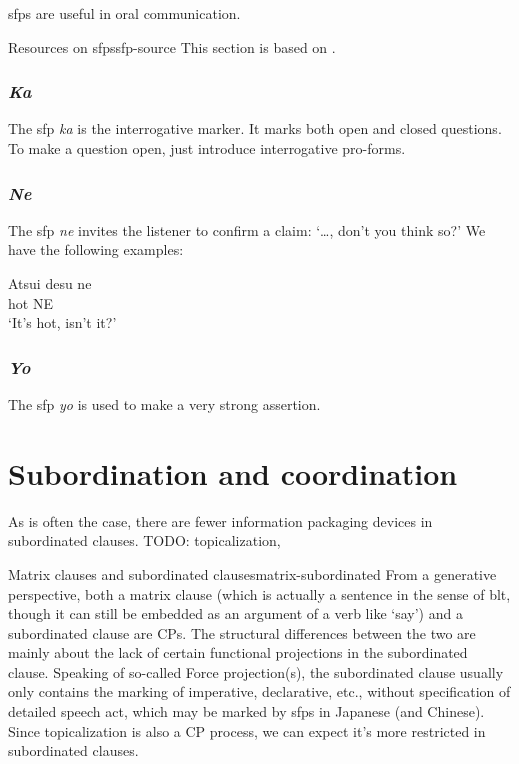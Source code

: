 \documentclass[UTF8, a4paper, oneside, scheme=plain]{ctexrep}
\newcommand*{\citesec}[1]{\S~{#1}}
\newcommand{\corpus}[1]{\emph{#1}}
\newcommand{\translate}[1]{`#1'}
\begin{document}
\ac{sfp}s are useful in oral communication.

\begin{infobox}{Resources on \ac{sfp}s}{sfp-source}
    This section is based on \citet[\citesec{6.4}]{akiyama2012japanese}.
\end{infobox}

\subsection{\corpus{Ka}}

The \ac{sfp} \corpus{ka} is the interrogative marker.
It marks both open and closed questions.
To make a question open,
just introduce interrogative pro-forms.

\subsection{\corpus{Ne}}

The \ac{sfp} \corpus{ne} invites the listener to confirm a claim:
\translate{\dots, don't you think so?}
We have the following examples:
\begin{exe}
    \ex \gll Atsui desu ne  \\
    hot {} NE  \\
    \glt \translate{It's hot, isn't it?}
\end{exe}

\subsection{\corpus{Yo}}

The \ac{sfp} \corpus{yo} is used to make a very strong assertion.

\chapter{Subordination and coordination}

As is often the case, there are fewer information packaging devices in subordinated clauses.
TODO: topicalization, 

\begin{theorybox}{Matrix clauses and subordinated clauses}{matrix-subordinated}
    From a generative perspective, both a matrix clause 
    (which is actually a sentence in the sense of \acs{blt}, 
    though it can still be embedded as an argument of a verb like \translate{say})
    and a subordinated clause are CPs.
    The structural differences between the two 
    are mainly about the lack of certain functional projections in the subordinated clause.
    Speaking of so-called Force projection(s),
    the subordinated clause usually only contains the marking of 
    imperative, declarative, etc.,
    without specification of detailed speech act,
    which may be marked by \ac{sfp}s in Japanese (and Chinese).
    Since topicalization is also a CP process,
    we can expect it's more restricted in subordinated clauses.
\end{theorybox}
\end{document}
